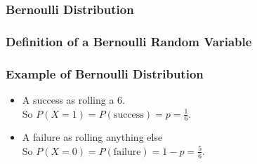 \documentclass[slides]{beamer}
\newcommand{\blue}[1]{\textcolor{blue2}{#1}}
\begin{document}
\begin{frame}
\frametitle{Bernoulli Distribution}

%
%
%
%


\end{frame}


\begin{frame}[fragile]
\frametitle{Definition of a Bernoulli Random Variable}

%
%
%

\end{frame}


\begin{frame}[fragile]
\frametitle{Example of Bernoulli Distribution}

\begin{itemize}
\item A success as rolling a 6.\\
So $P(X=1) = P(\mbox{success}) = p =  \frac{1}{6}$.
\item A failure as rolling anything else\\
So $P(X=0) = P(\mbox{failure}) = 1-p = \frac{5}{6}$.
\end{itemize}

\end{frame}
\end{document}
